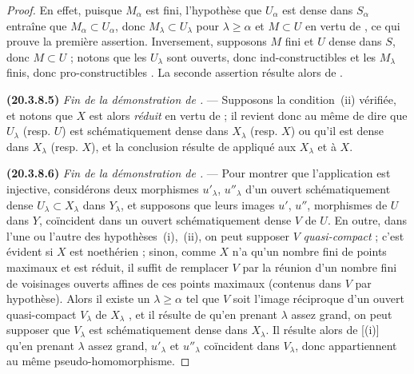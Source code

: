 \begin{proof}
En effet, puisque $M_\alpha$ est fini, l'hypothèse que $U_\alpha$ est dense dans $S_\alpha$ entraîne que
$M_\alpha\subset U_\alpha$, donc $M_\lambda\subset U_\lambda$ pour $\lambda\geq\alpha$ et $M\subset U$ en vertu de , ce qui prouve la première assertion.
Inversement, supposons $M$ fini et $U$ dense dans $S$, donc $M\subset U$ ; notons que les $U_\lambda$ sont ouverts, donc ind-constructibles et les $M_\lambda$ finis, donc pro-constructibles .
La seconde assertion résulte alors de .

\label{IV.20.3.8.5}
\textbf{(20.3.8.5)} \emph{Fin de la démonstration de .} ---
Supposons la condition~(ii) vérifiée, et notons que $X$ est alors \emph{réduit} en vertu de  ; il revient donc au même de dire que $U_\lambda$ (resp. $U$) est schématiquement dense dans $X_\lambda$ (resp. $X$) ou qu'il est dense dans $X_\lambda$ (resp. $X$), et la conclusion résulte de  appliqué aux $X_\lambda$ et à $X$.

\label{IV.20.3.8.6}
\textbf{(20.3.8.6)} \emph{Fin de la démonstration de .} ---
Pour montrer que l'application  est injective, considérons deux morphismes $u'_\lambda$, $u''_\lambda$ d'un ouvert schématiquement dense $U_\lambda\subset X_\lambda$ dans $Y_\lambda$, et supposons que leurs images $u'$, $u''$, morphismes de $U$ dans $Y$, coïncident dans un ouvert schématiquement dense $V$ de $U$.
En outre, dans l'une ou l'autre des hypothèses~(i),~(ii), on peut supposer $V$ \emph{quasi-compact} ; c'est évident si $X$ est noethérien ; sinon, comme $X$ n'a qu'un nombre fini de points maximaux et est réduit, il suffit de remplacer $V$ par la réunion d'un nombre fini de voisinages ouverts affines de ces points maximaux (contenus dans $V$ par hypothèse).
Alors il existe un $\lambda\geq\alpha$ tel que $V$ soit l'image réciproque d'un ouvert quasi-compact $V_\lambda$ de $X_\lambda$ , et il résulte de  qu'en prenant $\lambda$ assez grand, on peut supposer que $V_\lambda$ est schématiquement dense dans $X_\lambda$.
Il résulte alors de [(i)] qu'en prenant $\lambda$ assez grand, $u'_\lambda$ et $u''_\lambda$ coïncident dans $V_\lambda$, donc appartiennent au même pseudo-homomorphisme.


\end{proof}

